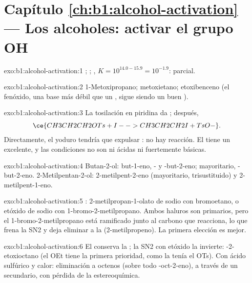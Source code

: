 \section*{Capítulo \ref{ch:b1:alcohol-activation} --- Los alcoholes: activar el grupo OH}

\begin{solution}{exo:b1:alcohol-activation:1}
;
;
, $K = 10^{14.0 - 15.9} = 10^{-1.9}$:
parcial.
\end{solution}

\begin{solution}{exo:b1:alcohol-activation:2}
1-Metoxipropano; metoxietano; etoxibenceno (el fenóxido, una base más
débil que un , sigue siendo un buen ).
\end{solution}

\begin{solution}{exo:b1:alcohol-activation:3}
La tosilación en piridina da ; después,
\[ \ce{CH3CH2CH2OTs + I- -> CH3CH2CH2I + TsO-}. \] Directamente, el yoduro
tendría que expulsar : no hay reacción. El  tiene un  excelente, y las condiciones no son ni ácidas ni fuertemente
básicas.
\end{solution}

\begin{solution}{exo:b1:alcohol-activation:4}
Butan-2-ol: but-1-eno, - y -but-2-eno; mayoritario,
-but-2-eno. 2-Metilpentan-2-ol: 2-metilpent-2-eno (mayoritario,
trisustituido) y 2-metilpent-1-eno.
\end{solution}

\begin{solution}{exo:b1:alcohol-activation:5}
: 2-metilpropan-1-olato de sodio con
bromoetano, o etóxido de sodio con 1-bromo-2-metilpropano. Ambos haluros
son primarios, pero el 1-bromo-2-metilpropano está ramificado junto al
carbono que reacciona, lo que frena la SN2 y deja eliminar a la  (2-metilpropeno). La primera elección es mejor.
\end{solution}

\begin{solution}{exo:b1:alcohol-activation:6}
El  conserva la  ; la SN2 con etóxido la
invierte: -2-etoxioctano (el OEt tiene la primera prioridad, como
la tenía el OTs). Con ácido sulfúrico y calor: eliminación a octenos
(sobre todo -oct-2-eno), a través de un  secundario, con
pérdida de la estereoquímica.
\end{solution}

